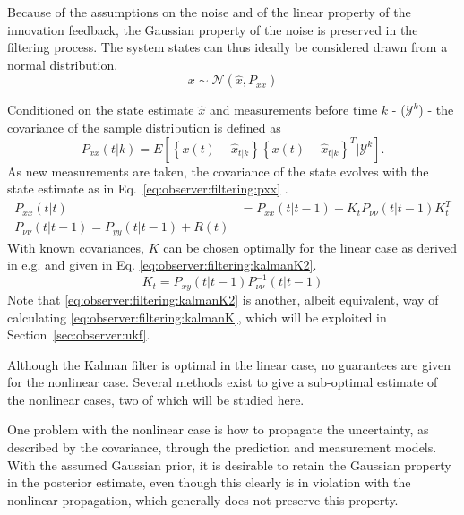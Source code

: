     Because of the assumptions on the noise and of the linear property
    of the innovation feedback, the Gaussian property of the noise is preserved
    in the filtering process. The system states can thus ideally
    be considered drawn from a normal distribution.
    \begin{equation}
        x \sim \mathcal{N}\left(\hat{x}, P_{xx}\right)
    \end{equation}

    Conditioned on the state estimate $\hat{x}$ and measurements before time $k$ - ($\mathcal{Y}^{k}$) - the
    covariance of the sample distribution is defined as
    \begin{equation}
        P_{xx}(t|k) = E \left[ \left\lbrace x(t) - \hat{x}_{t|k} \right\rbrace
                               \left\lbrace x(t) - \hat{x}_{t|k} \right\rbrace^{T}
                               | \mathcal{Y}^{k} \right] .
    \end{equation}
    As new measurements are taken, the covariance of the state evolves
    with the state estimate as in Eq.~\eqref{eq:observer:filtering:pxx} \citep{Julier95anewapproach}.
    \begin{align}
        P_{xx}(t|t) &= P_{xx}(t|t-1) - K_{t}P_{\nu\nu}(t|t-1)K_{t}^{T} \label{eq:observer:filtering:pxx} \\
        P_{\nu\nu}(t|t-1) = P_{yy}(t|t-1) + R(t) \label{eq:observer:filtering:pnunu}
    \end{align}
    With known covariances, $K$ can be chosen optimally for the linear case as derived in e.g. \citep{gustafsson2010statistical}
    and given in Eq. \eqref{eq:observer:filtering:kalmanK2}.
    \begin{equation}
        \label{eq:observer:filtering:kalmanK2}
        K_{t} = P_{xy}(t|t-1)P_{\nu\nu}^{-1}(t|t-1)
    \end{equation}
    Note that \eqref{eq:observer:filtering:kalmanK2} is another, albeit equivalent,
    way of calculating \eqref{eq:observer:filtering:kalmanK}, which will be exploited
    in Section~\ref{sec:observer:ukf}.

    Although the Kalman filter is optimal in the linear case, no guarantees are given for the nonlinear case.
    Several methods exist to give a sub-optimal estimate of the nonlinear cases,
    two of which will be studied here.

    One problem with the nonlinear case is how to propagate the uncertainty,
    as described by the covariance, through the prediction and measurement models.
    With the assumed Gaussian prior, it is desirable to retain the Gaussian
    property in the posterior estimate, even though this clearly is in violation with the
    nonlinear propagation, which generally does not preserve this property.

